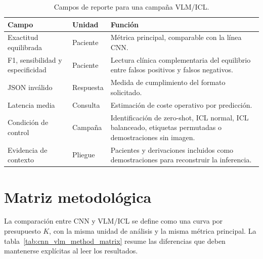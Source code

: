 \begin{table}[H]
  \centering
  \small
  \begin{tabularx}{\textwidth}{p{3.6cm}p{3.2cm}X}
    \toprule
    Campo & Unidad & Función \\
    \midrule
    Exactitud equilibrada & Paciente & Métrica principal, comparable con la línea CNN. \\
    F1, sensibilidad y especificidad & Paciente & Lectura clínica complementaria del equilibrio entre falsos positivos y falsos negativos. \\
    JSON inválido & Respuesta & Medida de cumplimiento del formato solicitado. \\
    Latencia media & Consulta & Estimación de coste operativo por predicción. \\
    Condición de control & Campaña & Identificación de zero-shot, ICL normal, ICL balanceado, etiquetas permutadas o demostraciones sin imagen. \\
    Evidencia de contexto & Pliegue & Pacientes y derivaciones incluidos como demostraciones para reconstruir la inferencia. \\
    \bottomrule
  \end{tabularx}
  \caption{Campos de reporte para una campaña VLM/ICL.}
  \label{tab:vlm_reporting_fields}
\end{table}

\section{Matriz metodológica}

La comparación entre CNN y VLM/ICL se define como una curva por presupuesto \(K\), con la misma unidad de análisis y la misma métrica principal. La tabla~\ref{tab:cnn_vlm_method_matrix} resume las diferencias que deben mantenerse explícitas al leer los resultados.

